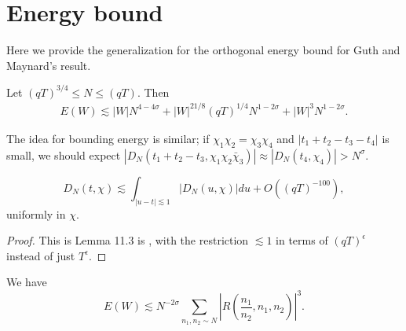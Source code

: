 
\section{Energy bound}
Here we provide the generalization for the orthogonal energy bound for Guth and Maynard's result. 
\begin{proposition}\label{energybound}
    Let $(qT)^{3/4}\leq N\leq (qT)$. Then
    \begin{align*}
E(W)\lesssim |W|N^{4-4\sigma}+|W|^{21/8}(qT)^{1/4}N^{1-2\sigma}+|W|^3N^{1-2\sigma}.
    \end{align*}
\end{proposition}
The idea for bounding energy is similar; if $\chi_1\chi_2=\chi_3\chi_4$ and $|t_1+t_2-t_3-t_4|$ is small, we should expect $|D_N(t_1+t_2-t_3,\chi_1\chi_2\bar{\chi}_3)|\approx |D_N(t_4,\chi_4)|>N^\sigma$.
\begin{lemma}
    \label{Dirichletint}
    \[
    D_N(t,\chi)\lesssim \int_{|u-t|\lesssim 1} |D_N(u,\chi)|du + O((qT)^{-100}),
    \]
    uniformly in $\chi$.
\end{lemma}
\begin{proof}
    This is Lemma 11.3 is \cite{GM2024}, with the restriction $\lesssim 1$ in terms of $(qT)^{\epsilon}$ instead of just $T^{\epsilon}$.
\end{proof}
\begin{lemma} We have \[
    E(W)\lesssim N^{-2\sigma}\sum_{n_1,n_2\sim N}\left|R\left(\frac{n_1}{n_2},n_1,n_2\right) \right|^3.
    \]
    
\end{lemma}

